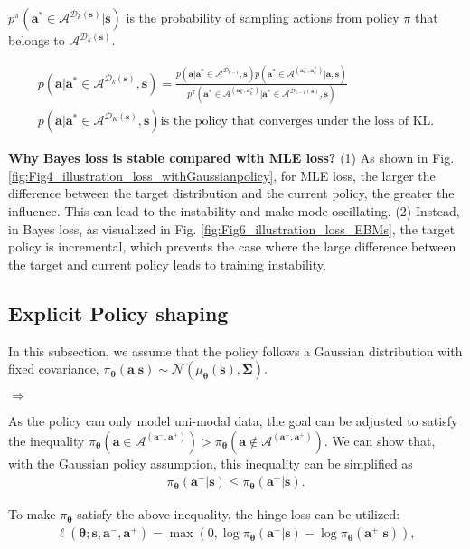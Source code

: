 $ p^{\pi} (\bm a^* \in \mathcal{A}^{\mathcal{D}_k(\bm s)} | \bm s)$ is the probability of sampling actions from policy $\pi$ that belongs to $\mathcal{A}^{\mathcal{D}_k(\bm s)}$.

\begin{align}
p( \bm a |  \bm a^* \in \mathcal{A}^{\mathcal{D}_{k}(\bm s)},  \bm s) =\frac{ p ( \bm a |  \bm a^* \in \mathcal{A}^{\mathcal{D}_{k-1}} , \bm s) p (\bm a^* \in \mathcal{A}^{(\bm a^-_{k},\bm a^+_{k} )} | \bm a, \bm s) }{p^\pi (\bm a^* \in \mathcal{A}^{(\bm a^-_{k},\bm a^+_{k} )} |\bm a^* \in \mathcal{A}^{\mathcal{D}_{k-1}(\bm s)} , \bm s)} \\
    p( \bm a |  \bm a^* \in \mathcal{A}^{\mathcal{D}_{K}(\bm s)},  \bm s) \text{is the policy that converges under the loss of KL.}
\end{align}

\textbf{Why Bayes loss is stable compared with MLE loss?}
(1) As shown in Fig. \ref{fig:Fig4_illustration_loss_withGaussianpolicy},  for MLE loss, the larger the difference between the target distribution and the current policy, the greater the influence. This can lead to the instability and make mode oscillating. 
(2) Instead, in Bayes loss, as visualized in Fig. \ref{fig:Fig6_illustration_loss_EBMs}, the target policy is incremental, which prevents the case where the large difference between the target and current policy leads to training instability.  



\subsection{Explicit Policy shaping}

In this subsection, we assume that the policy follows a Gaussian distribution with fixed covariance, $\pi_{\bm \theta}(\bm a | \bm s) \sim\mathcal{N} (\mu_{\bm \theta}(\bm s), \bm \Sigma)$.

$\Rightarrow$

As the policy can only model uni-modal data, the goal can be adjusted to 
satisfy the inequality 
$\pi_{\bm \theta}(\bm a \in \mathcal{A}^{(\bm a^-, \bm a^+)}) >\pi_{\bm \theta}(\bm a \notin \mathcal{A}^{(\bm a^-, \bm a^+)}) $.
We can show that, with the Gaussian policy assumption, this inequality can be simplified as 
\begin{align}
    \pi_{\bm \theta}(\bm a^{-}|\bm s) \leq \pi_{\bm \theta}(\bm a^{+}|\bm s).
    \label{eq:policy_improvement}
\end{align}

To make $\pi_{\bm \theta}$ satisfy the above inequality, the hinge loss can be utilized:
\begin{align}
\ell (\bm \theta;\bm s, \bm a^{-}, \bm  a^{+}) =  \max (0,  \log \pi_{\bm \theta}(\bm a^{-}|\bm s) - \log\pi_{\bm \theta}(\bm a^{+}|\bm s)  ), 
\label{eq:loss_policy_improvement}
\end{align}

